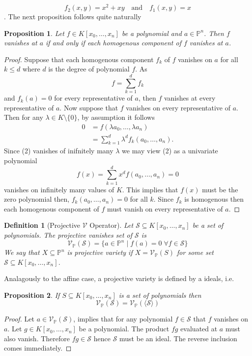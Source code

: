 \documentclass[40pt]{article}
\newtheorem{definition}{Definition}[section]
\newcommand{\mcal}[1]{\mathcal{#1}}
\newcommand{\Proj}{\mathbb{P}}
\newcommand{\V}{\mathcal{V}}
\newtheorem{proposition}{Proposition}[section]
\theoremstyle{remark}
\begin{document}
\[f_2(x,y) = x^2 + xy \quad\text{and}\quad f_1(x,y) = x\]. 
The next proposition follows quite naturally
\begin{proposition}
	Let $f \in K[x_0,\dots,x_n]$ be a polynomial and $a \in \Proj^n$. Then $f$ vanishes at $a$ if and only if each homogenous component of $f$ vanishes at $a$. 
\end{proposition}
\begin{proof}
	Suppose that each homogenous component $f_k$ of $f$ vanishes on $a$ for all $k \leq d$ where $d$ is the degree of polynomial $f$. As 
	\[f = \sum_{k=1}^d f_k\]
	and $f_k(a) = 0$ for every representative of $a$, then $f$ vanishes at every representative of $a$. Now suppose that $f$ vanishes on every representative of $a$. Then for any $\lambda \in K\setminus \{0\}$, by assumption it follows
	\begin{align}
		0 &= f(\lambda a_0,\dots,\lambda a_n) \\
		&= \sum_{k=1}^d \lambda^d f_k(a_0,\dots,a_n).
	\end{align}
	Since (2) vanishes of inifnitely many $\lambda$ we may view (2) as a univariate polynomial 
	\[f(x) = \sum_{k=1}^d x^d f(a_0,\dots,a_n) = 0\]
	vanishes on infinitely many values of $K$. This implies that $f(x)$ must be the zero polynomial then, $f_k(a_0,\dots,a_n) = 0$ for all $k$. Since $f_k$ is homogenous then each homogenous component of $f$ must vanish on every representative of $a$. 
\end{proof}
\begin{definition}[Projective $\V$ Operator]
	Let $\mathcal{S} \subseteq K[x_0,\dots,x_n]$ be a set of polynomials. The projective vanishes set of $\mathcal{S}$ is 
	\[\V_\Proj(\mcal{S}) = \{a \in \Proj^n \; | \; f(a)=0 \; \forall f \in \mcal{S}\}\]
	We say that $X \subseteq \Proj^n$ is projective variety if $X = \V_\Proj(S)$ for some set $\mcal{S} \subseteq K[x_0,\dots,x_n]$. 
\end{definition}
Analagously to the affine case, a projective variety is defined by a ideals, i.e. 
\begin{proposition}
	If $S \subseteq K[x_0,\dots,x_n]$ is a set of polynomials then 
	\[\V_\Proj(\mcal{S}) = \V_\Proj(\langle \mcal{S} \rangle)\]
\end{proposition}
\begin{proof}
	Let $a \in \V_\Proj(\mcal{S})$, implies that for any polynomial $f \in \mcal{S}$ that $f$ vanishes on $a$. Let $g \in K[x_0,\dots,x_n]$ be a polynomial. The product $fg$ evaluated at $a$ must also vanish. Therefore $fg \in \mcal{S}$ hence $\mcal{S}$ must be an ideal. The reverse inclusion comes immediately. 
\end{proof}
\end{document}
